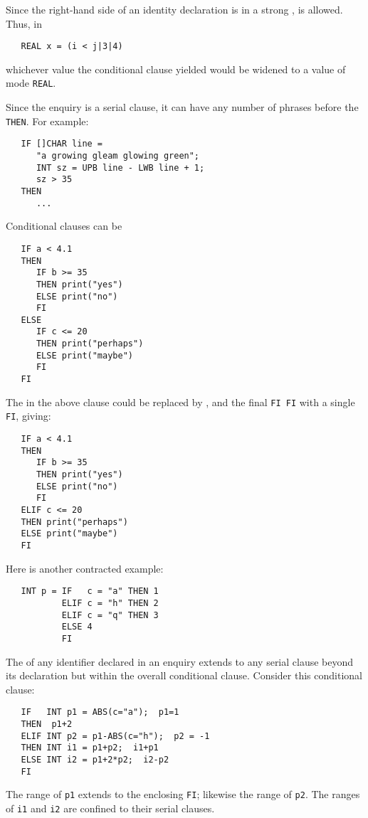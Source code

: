 Since the right-hand side of an identity declaration is in a strong
,
 is allowed. Thus, in
\begin{verbatim}
   REAL x = (i < j|3|4)
\end{verbatim}
\noindent
whichever value the conditional clause yielded would be widened to a
value of mode \verb|REAL|.

Since the enquiry  is a serial clause,
it can have any number of phrases before the \verb|THEN|. For example:
\begin{verbatim}
   IF []CHAR line =
      "a growing gleam glowing green";
      INT sz = UPB line - LWB line + 1;
      sz > 35
   THEN
      ...
\end{verbatim}

Conditional clauses can be 
\begin{verbatim}
   IF a < 4.1
   THEN
      IF b >= 35
      THEN print("yes")
      ELSE print("no")
      FI
   ELSE
      IF c <= 20
      THEN print("perhaps")
      ELSE print("maybe")
      FI
   FI
\end{verbatim}
\noindent
The  in the above clause could be replaced by
, and the final \verb|FI FI| with a single \verb|FI|,
giving:
\begin{verbatim}
   IF a < 4.1
   THEN
      IF b >= 35
      THEN print("yes")
      ELSE print("no")
      FI
   ELIF c <= 20
   THEN print("perhaps")
   ELSE print("maybe")
   FI
\end{verbatim}
\noindent
Here is another contracted example:
\begin{verbatim}
   INT p = IF   c = "a" THEN 1
           ELIF c = "h" THEN 2
           ELIF c = "q" THEN 3
           ELSE 4
           FI
\end{verbatim}

The  of any identifier declared in an enquiry
 extends to any serial clause beyond
its declaration but within the overall conditional clause. Consider
this conditional clause:
\begin{verbatim}
   IF   INT p1 = ABS(c="a");  p1=1
   THEN  p1+2
   ELIF INT p2 = p1-ABS(c="h");  p2 = -1
   THEN INT i1 = p1+p2;  i1+p1
   ELSE INT i2 = p1+2*p2;  i2-p2
   FI
\end{verbatim}
\noindent
The range of \verb|p1| extends to the enclosing \verb|FI|; likewise
the range of \verb|p2|. The ranges of \verb|i1| and \verb|i2| are
confined to their serial clauses.

